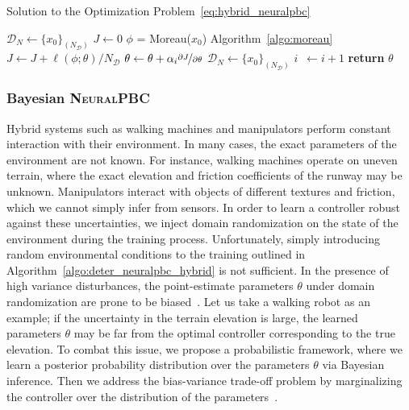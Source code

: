 \begin{algorithm}
    \caption{Solution to the Optimization Problem~\eqref{eq:hybrid_neuralpbc}}
    \label{algo:deter_neuralpbc_hybrid}
    \small
    \begin{algorithmic}[1]
        \algrenewcommand\algorithmicindent{0em} %
        \State $\mathcal{D}_N \gets \{x_0\}_{(N_{\mathcal{D}})}$   
        \algrenewcommand\algorithmicindent{1.1em} %
        \State $J \gets 0$
            \State $\phi$ = Moreau($x_0$) \Comment Algorithm~\eqref{algo:moreau}
            \State $J \gets J + \ell(\phi; \theta)/N_{\mathcal{D}}$ 
        \EndFor
        \State $\theta \gets \theta + \alpha_i \nicefrac{\partial J}{\partial \theta}$
        \State $\mathcal{D}_N \gets \{x_0\}_{(N_{\mathcal{D}})}$
        \State $i \;\:\gets i + 1$
        \EndWhile
        \State \textbf{return} $\theta$
    \end{algorithmic}
\end{algorithm}

\subsubsection{Bayesian \textsc{NeuralPBC}}
\label{sssec:bayesian_inference}

Hybrid systems such as walking machines and manipulators perform constant
interaction with their environment. In many cases, the exact parameters of the
environment are not known. For instance, walking machines operate on uneven
terrain, where the exact elevation and friction coefficients of the runway may
be unknown. Manipulators interact with objects of different textures and
friction, which we cannot simply infer from sensors. 
%
In order to learn a controller robust against these uncertainties, we inject
domain randomization on the state of the environment during the training
process.
%
Unfortunately, simply introducing random environmental conditions to the
training outlined in Algorithm~\ref{algo:deter_neuralpbc_hybrid} is not sufficient. 
%
In the presence of high variance disturbances, the point-estimate parameters
$\theta$ under domain randomization are prone to be
biased~\cite{ashenafi2022robustness}.
%
Let us take a walking robot as an example; if the uncertainty in the terrain
elevation is large, the learned parameters $\theta$ may be far from the optimal
controller corresponding to the true elevation.
%
To combat this issue, we propose a probabilistic framework, where we learn a
posterior probability distribution over the parameters $\theta$ via Bayesian
inference. 
%
Then we address the bias-variance trade-off problem by marginalizing the
controller over the distribution of the parameters~\cite{bishop2006pattern}.

